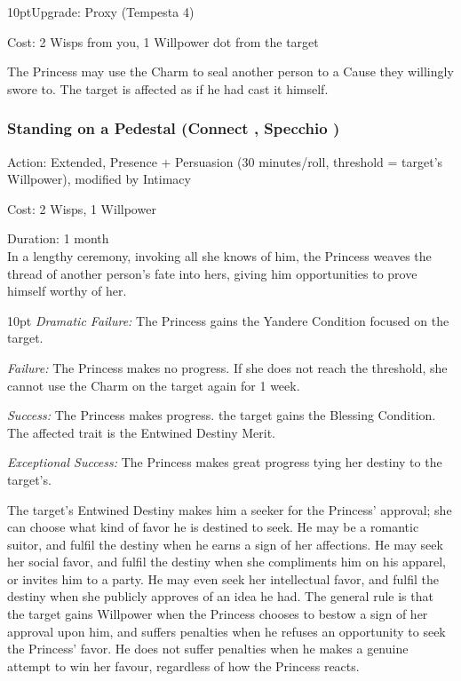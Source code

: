 \begin{myindentpar}{10pt}Upgrade: Proxy (Tempesta 4)

\noindent Cost: 2 Wisps from you, 1 Willpower dot from the target

The Princess may use the Charm to seal another person to a Cause they willingly swore to. The target is affected as if he had cast it himself.\end{myindentpar}

\subsubsection*{Standing on a Pedestal (Connect \textbullet\textbullet\textbullet\textbullet, Specchio \textbullet\textbullet\textbullet)}

\noindent Action: Extended, Presence + Persuasion (30 minutes/roll, threshold = target's Willpower), modified by Intimacy

\noindent Cost: 2 Wisps, 1 Willpower

\noindent Duration: 1 month \\

\noindent In a lengthy ceremony, invoking all she knows of him, the Princess weaves the thread of another person's fate into hers, giving him opportunities to prove himself worthy of her.

\begin{myindentpar}{10pt}        \emph{Dramatic Failure:} The Princess gains the Yandere Condition focused on the target.

        \emph{Failure:} The Princess makes no progress. If she does not reach the threshold, she cannot use the Charm on the target again for 1 week.

        \emph{Success:} The Princess makes progress. the target gains the Blessing Condition. The affected trait is the Entwined Destiny Merit.

        \emph{Exceptional Success:} The Princess makes great progress tying her destiny to the target's.\end{myindentpar}

The target's Entwined Destiny makes him a seeker for the Princess' approval; she can choose what kind of favor he is destined to seek. He may be a romantic suitor, and fulfil the destiny when he earns a sign of her affections. He may seek her social favor, and fulfil the destiny when she compliments him on his apparel, or invites him to a party. He may even seek her intellectual favor, and fulfil the destiny when she publicly approves of an idea he had. The general rule is that the target gains Willpower when the Princess chooses to bestow a sign of her approval upon him, and suffers penalties when he refuses an opportunity to seek the Princess' favor. He does not suffer penalties when he makes a genuine attempt to win her favour, regardless of how the Princess reacts.


